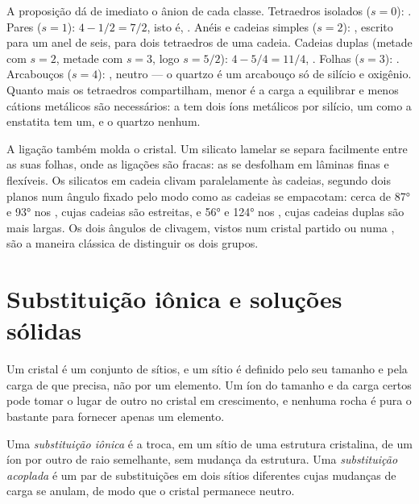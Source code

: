 A proposição dá de imediato o ânion de cada classe. Tetraedros isolados ($s = 0$): . Pares ($s = 1$): $4 - 1/2 = 7/2$, isto é, . Anéis e cadeias simples ($s = 2$): , escrito  para um anel de seis,  para dois tetraedros de uma cadeia. Cadeias duplas (metade com $s = 2$, metade com $s = 3$, logo $s = 5/2$): $4 - 5/4 = 11/4$, . Folhas ($s = 3$): . Arcabouços ($s = 4$): , neutro --- o quartzo é um arcabouço só de silício e oxigênio. Quanto mais os tetraedros compartilham, menor é a carga a equilibrar e menos cátions metálicos são necessários: a   tem dois íons metálicos por silício, um  como a enstatita  tem um, e o quartzo nenhum.

A ligação também molda o cristal. Um silicato lamelar se separa facilmente entre as suas folhas, onde as ligações são fracas: as  se desfolham em lâminas finas e flexíveis. Os silicatos em cadeia clivam paralelamente às cadeias, segundo dois planos num ângulo fixado pelo modo como as cadeias se empacotam: cerca de \ang{87} e \ang{93} nos , cujas cadeias são estreitas, e \ang{56} e \ang{124} nos , cujas cadeias duplas são mais largas. Os dois ângulos de clivagem, vistos num cristal partido ou numa , são a maneira clássica de distinguir os dois grupos.

\section{Substituição iônica e soluções sólidas}

Um cristal é um conjunto de sítios, e um sítio é definido pelo seu tamanho e pela carga de que precisa, não por um elemento. Um íon do tamanho e da carga certos pode tomar o lugar de outro no cristal em crescimento, e nenhuma rocha é pura o bastante para fornecer apenas um elemento.

\begin{definition}\label{def:b1:rock-forming-minerals:substitution}
Uma \emph{substituição iônica} é a troca, em um sítio de uma estrutura cristalina, de um íon por outro de raio semelhante, sem mudança da estrutura. Uma \emph{substituição acoplada} é um par de substituições em dois sítios diferentes cujas mudanças de carga se anulam, de modo que o cristal permanece neutro.
\end{definition}

